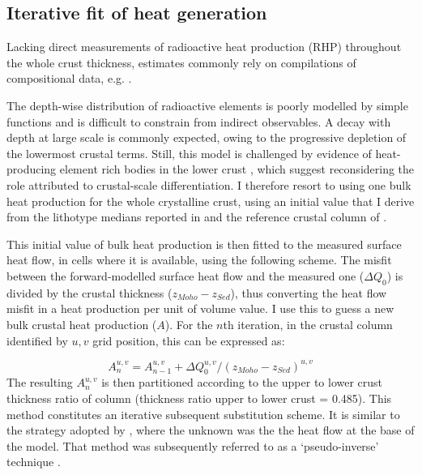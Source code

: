 \subsection{Iterative fit of heat generation}
\label{ss:Appl:ThermRHP}
Lacking direct measurements of radioactive heat production (RHP) throughout the whole crust thickness, estimates commonly rely on compilations of compositional data, e.g. \textcites{Vila2010}{Artemieva2017granite}{Hasterok2017_ign}{Hasterok2017_mis}.

The depth-wise distribution of radioactive elements is poorly modelled by simple functions \parencite{Jaupart2003} and is difficult to constrain from indirect observables.
A decay with depth at large scale is commonly expected, owing to the progressive depletion of the lowermost crustal terms.
Still, this model is challenged by evidence of heat-producing element rich bodies in the lower crust \parencite{Alessio2018deepRHP}, which suggest reconsidering the role attributed to crustal-scale differentiation.
I therefore resort to using one bulk heat production for the whole crystalline crust, using an initial value that I derive from the lithotype medians reported in \textcite{Vila2010} and the reference crustal column of \textcite{Wedepohl1995}.

This initial value of bulk heat production is then fitted to the measured surface heat flow, in cells where it is available, using the following scheme.
The misfit between the forward-modelled surface heat flow and the measured one ($\Delta Q_0$) is divided by the crustal thickness ($z_{Moho} - z_{Sed}$), thus converting the heat flow misfit in a heat production per unit of volume value.
I use this to guess a new bulk crustal heat production ($A$).
For the $n$th iteration, in the crustal column identified by $u, v$ grid position, this can be expressed as:

\begin{equation}
	\label{eq:IterativeRHP}
	A_n^{u,v} = A_{n-1}^{u,v} + \Delta Q_0^{u,v} / (z_{Moho} - z_{Sed})^{u,v}
\end{equation}
The resulting $A_n^{u,v}$ is then partitioned according to the upper to lower crust thickness ratio of \textcite{Wedepohl1995} column (thickness ratio upper to lower crust = 0.485).
This method constitutes an iterative subsequent substitution scheme.
It is similar to the strategy adopted by \textcite{Cermak1986}, where the unknown was the the heat flow at the base of the model.
That method was subsequently referred to as a `pseudo-inverse' technique \parencite{Cermak1993}.

